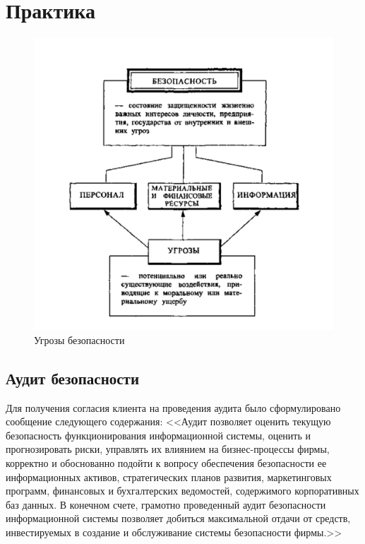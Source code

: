 \section{Практика}

\begin{figure}
	\includegraphics[width=\textwidth]{img/main_scheme.png}
	\caption{Угрозы безопасности}	
\end{figure}

\subsection{Аудит безопасности}

Для получения согласия клиента на проведения аудита было сформулировано сообщение следующего содержания:  <<Аудит позволяет оценить текущую безопасность функционирования информационной системы, оценить и прогнозировать риски, управлять их влиянием на бизнес-процессы фирмы, корректно и обоснованно подойти к вопросу обеспечения безопасности ее информационных активов, стратегических планов развития, маркетинговых программ, финансовых и бухгалтерских ведомостей, содержимого корпоративных баз данных. В конечном счете, грамотно проведенный аудит безопасности информационной системы позволяет добиться максимальной отдачи от средств, инвестируемых в создание и обслуживание системы безопасности фирмы.>>

